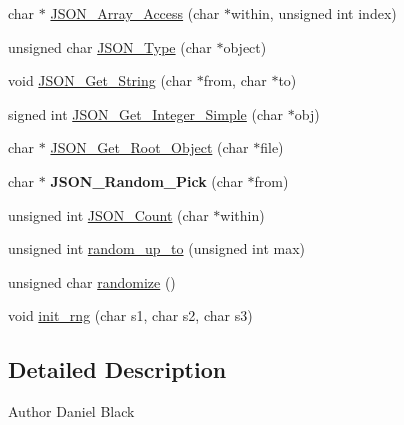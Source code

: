 \begin{DoxyCompactItemize}
\item 
char $\ast$ \hyperlink{libfortune-0_81_8h_a782f3728bd38a0f6197006299e899269}{\-J\-S\-O\-N\-\_\-\-Array\-\_\-\-Access} (char $\ast$within, unsigned int index)
\item 
unsigned char \hyperlink{libfortune-0_81_8h_ad89db89264f28e53242394f437c52d6c}{\-J\-S\-O\-N\-\_\-\-Type} (char $\ast$object)
\item 
void \hyperlink{libfortune-0_81_8h_a57aad7508634da6656769b019de5e07c}{\-J\-S\-O\-N\-\_\-\-Get\-\_\-\-String} (char $\ast$from, char $\ast$to)
\item 
signed int \hyperlink{libfortune-0_81_8h_a9dda3cdeca6624eef215776a4825aa77}{\-J\-S\-O\-N\-\_\-\-Get\-\_\-\-Integer\-\_\-\-Simple} (char $\ast$obj)
\item 
char $\ast$ \hyperlink{libfortune-0_81_8h_a98b13204bb0f4c3dbaef87259767dfcf}{\-J\-S\-O\-N\-\_\-\-Get\-\_\-\-Root\-\_\-\-Object} (char $\ast$file)
\item 
\hypertarget{libfortune-0_81_8h_a2d51cec3c76e02eac445acaa1afa9b21}{char $\ast$ {\bfseries \-J\-S\-O\-N\-\_\-\-Random\-\_\-\-Pick} (char $\ast$from)}\label{libfortune-0_81_8h_a2d51cec3c76e02eac445acaa1afa9b21}

\item 
unsigned int \hyperlink{libfortune-0_81_8h_aecbb4d24659ac06794bc2f9a642c038c}{\-J\-S\-O\-N\-\_\-\-Count} (char $\ast$within)
\item 
unsigned int \hyperlink{libfortune-0_81_8h_aa5e24e7fe12173f4dc6b99e36e5bda1a}{random\-\_\-up\-\_\-to} (unsigned int max)
\item 
unsigned char \hyperlink{libfortune-0_81_8h_a0ba09fe787749c67922dbb0b59758049}{randomize} ()
\item 
void \hyperlink{libfortune-0_81_8h_a0b4afb5af314702c76556b7d3ba0c84d}{init\-\_\-rng} (char s1, char s2, char s3)
\end{DoxyCompactItemize}


\subsection{\-Detailed \-Description}
\begin{DoxyAuthor}{\-Author}
\-Daniel \-Black 
\end{DoxyAuthor}


